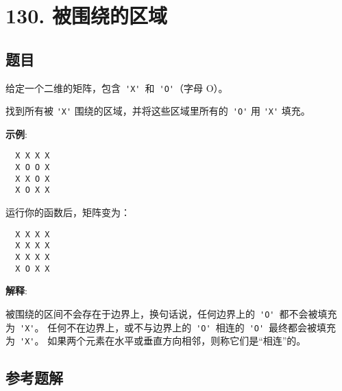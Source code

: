 \newpage
\section{130. 被围绕的区域}
\label{leetcode:130}

\subsection{题目}

给定一个二维的矩阵，包含 \verb|'X'| 和 \verb|'O'|（字母 O）。

找到所有被 \verb|'X'| 围绕的区域，并将这些区域里所有的 \verb|'O'| 用 \verb|'X'| 填充。

\textbf{示例}:

\begin{verbatim}
  X X X X
  X O O X
  X X O X
  X O X X
\end{verbatim}

运行你的函数后，矩阵变为：

\begin{verbatim}
  X X X X
  X X X X
  X X X X
  X O X X
\end{verbatim}

\textbf{解释}:

被围绕的区间不会存在于边界上，换句话说，任何边界上的 \verb|'O'| 都不会被填充为 \verb|'X'|。
任何不在边界上，或不与边界上的 \verb|'O'| 相连的 \verb|'O'| 最终都会被填充为 \verb|'X'|。
如果两个元素在水平或垂直方向相邻，则称它们是``相连''的。

\subsection{参考题解}

